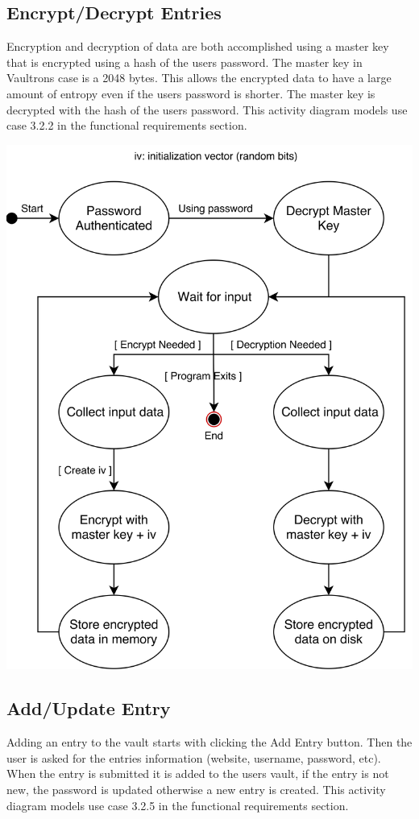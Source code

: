 \documentclass[11pt]{report}
\begin{document}
\clearpage

\subsection{Encrypt/Decrypt Entries}
Encryption and decryption of data are both accomplished using a master key that is encrypted using a hash of the users password. The master key in Vaultrons case is a 2048 bytes. This allows the encrypted data to have a large amount of entropy even if the users password is shorter. The master key is decrypted with the hash of the users password. This activity diagram models use case 3.2.2 in the functional requirements section.

\vspace{4mm}
\includegraphics[scale=.075]{encryption.png}

\clearpage

\subsection{Add/Update Entry}
Adding an entry to the vault starts with clicking the Add Entry button. Then the user is asked for the entries information (website, username, password, etc). When the entry is submitted it is added to the users vault, if the entry is not new, the password is updated otherwise a new entry is created. This activity diagram models use case 3.2.5 in the functional requirements section.
\end{document}
